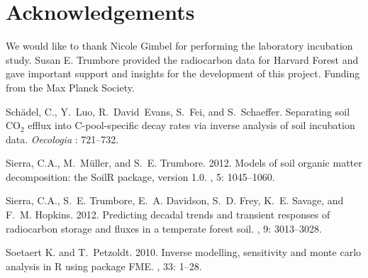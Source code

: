 \documentclass[a4paper]{article}
\begin{document}
\clearpage
\section*{Acknowledgements}
We would like to thank Nicole Gimbel for performing the laboratory incubation study. Susan E. Trumbore provided the radiocarbon data for Harvard Forest and gave important support and insights for the development of this project. Funding from the Max Planck Society. 

\begin{thebibliography}{9}
 Sch{\"a}del, C., Y.~Luo, R.~David~Evans, S.~Fei, and S.~Schaeffer.
\newblock Separating soil {CO$_2$} efflux into {C}-pool-specific decay rates
  via inverse analysis of soil incubation data. {\it Oecologia} : 721--732.

 Sierra, C.A., M.~M\"uller, and S.~E. Trumbore. 2012. \newblock Models of soil organic matter decomposition: the {SoilR} package, version 1.0. , 5: 1045--1060.

 Sierra, C.A., S.~E. Trumbore, E.~A. Davidson, S.~D. Frey, K.~E. Savage, and  F.~M. Hopkins. 2012.
\newblock Predicting decadal trends and transient responses of radiocarbon storage and fluxes in a temperate forest soil.
, 9: 3013--3028.

 Soetaert K. and T.~Petzoldt. 2010. \newblock Inverse modelling, sensitivity and monte carlo analysis in R using   package FME. , 33: 1--28.

\end{thebibliography}
\end{document}
